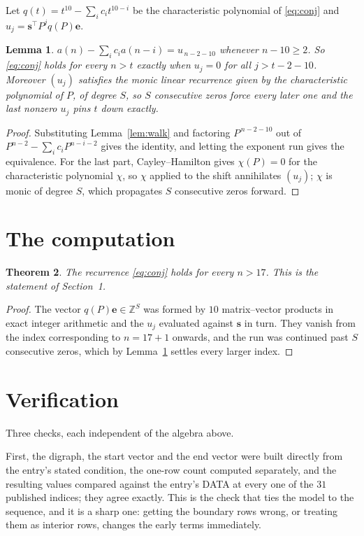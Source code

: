 \documentclass[11pt,a4paper]{article}
\theoremstyle{plain}
\newtheorem{theorem}{Theorem}
\newtheorem{lemma}[theorem]{Lemma}
\theoremstyle{definition}
\begin{document}
Let $q(t)=t^{10}-\sum_i c_i t^{10-i}$ be the characteristic polynomial of
\eqref{eq:conj} and $u_j=\mathbf{s}^{\!\top}P^{j}q(P)\mathbf{e}$.

\begin{lemma}\label{lem:crit}
$a(n)-\sum_i c_i a(n-i)=u_{\,n-2-10}$ whenever $n-10\ge2$. So \eqref{eq:conj}
holds for every $n>t$ exactly when $u_j=0$ for all $j>t-2-10$. Moreover $(u_j)$
satisfies the monic linear recurrence given by the characteristic polynomial of $P$, of
degree $S$, so $S$ consecutive zeros force every later one and the last nonzero $u_j$ pins
$t$ down exactly.
\end{lemma}

\begin{proof}
Substituting Lemma~\ref{lem:walk} and factoring $P^{\,n-2-10}$ out of
$P^{n-2}-\sum_i c_i P^{n-i-2}$ gives the identity, and letting the exponent run gives the
equivalence. For the last part, Cayley--Hamilton gives $\chi(P)=0$ for the characteristic
polynomial $\chi$, so $\chi$ applied to the shift annihilates $(u_j)$; $\chi$ is monic of
degree $S$, which propagates $S$ consecutive zeros forward.
\end{proof}

\section{The computation}

\begin{theorem}
The recurrence \eqref{eq:conj} holds for every $n>17$. This is the statement of
Section~1.
\end{theorem}

\begin{proof}
The vector $q(P)\mathbf{e}\in\mathbb{Z}^{S}$ was formed by $10$ matrix--vector
products in exact integer arithmetic and the $u_j$ evaluated against $\mathbf{s}$ in turn.
They vanish from the index corresponding to $n=17+1$ onwards, and the run was continued
past $S$ consecutive zeros, which by Lemma~\ref{lem:crit} settles every larger index.
\end{proof}

\section{Verification}

Three checks, each independent of the algebra above.

First, the digraph, the start vector and the end vector were built directly from the
entry's stated condition, the one-row count computed separately, and the resulting values
compared against the entry's DATA at every one of the $31$ published indices; they
agree exactly. This is the check that ties the model to the sequence, and it is a sharp one:
getting the boundary rows wrong, or treating them as interior rows, changes the early terms
immediately.
\end{document}
